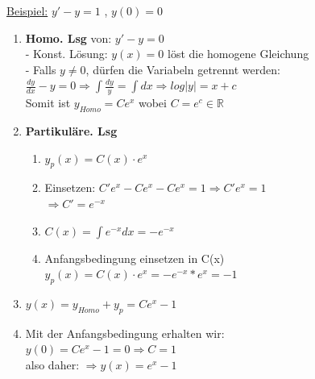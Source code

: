 \documentclass[6pt]{article}
\begin{document}
\begin{multicols*}{3}
	\vspace{3mm}
	\underline{Beispiel:} 	\hspace{5mm} 		$y' -y = 1$ , $y(0)=0$ \\
	\vspace{-5mm}
	\begin{enumerate}[label=(\roman*), itemsep=2pt, parsep=3pt ]
			\item {\bf Homo. Lsg} von: $y' - y = 0$ \\
					  - Konst. L{\"o}sung: $y(x)=0$ l{\"o}st die homogene Gleichung \vspace{0mm}\\
					  - Falls $y \not = 0$, d{\"u}rfen die Variabeln getrennt werden: \vspace{1mm}\\
					  $\frac{dy}{dx} -  y = 0 \Rightarrow \int \frac{dy}{y} = \int dx \Rightarrow log|y| = x + c$ \vspace{1mm}\\
					  Somit ist $y_{Homo} = Ce^x$ wobei $C = e^c\in \mathbb{R}$
			\item {\bf Partikul{\"a}re. Lsg} 
					\vspace{-2mm}
					\begin{enumerate}[itemsep=1pt, parsep=2pt]
						\item 	$y_p(x) = C(x) \cdot  e^x$
						\item 	Einsetzen: $C'e^x - Ce^x - Ce^x = 1 \Rightarrow C'e^x = 1$ \\
									$\Rightarrow C'  = e^{-x}$
						\item	$C(x) = \int e^{-x} dx = -e^{-x}$
						\item 	Anfangsbedingung einsetzen in C(x) \\
									$y_p(x) = C(x) \cdot  e^x = -e^{-x} * e^x  = -1$
					\end{enumerate}
					\vspace{-2mm}
			\item  $y(x) = y_{Homo} + y_p = Ce^x - 1$
			\item Mit der Anfangsbedingung erhalten wir:  \\
						$y(0)=Ce^x - 1 = 0 \Rightarrow C=1$  \vspace{2mm}\\ 
						also daher: $\Rightarrow y(x) = e^x -1 $
			
	\end{enumerate}
	
	
	\columnbreak

\end{multicols*}
\end{document}
